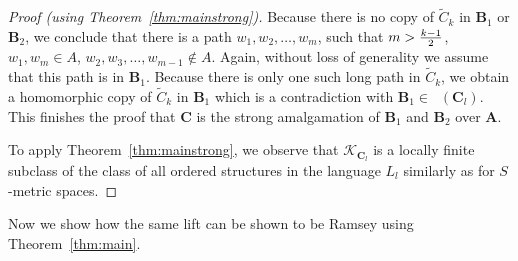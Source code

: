 \documentclass{elsarticle}
\def\Forb{\mathop{\mathrm{Forb_{he}}}\nolimits}
\def\str#1{\mathbf {#1}}
\def\K{{\mathcal K}}
\theoremstyle{plain}
\theoremstyle{definition}
\theoremstyle{remark}
\begin{document}
\begin{proof}[Proof (using Theorem~\ref{thm:mainstrong})]
Because there
is no copy of $\widetilde{C}_k$ in $\str{B}_1$ or $\str{B}_2$,
we conclude that there is a path  $w_1,w_2,\ldots, w_m$, such that $m>{k-1\over 2}$,
$w_1,w_m\in A$, $w_2,w_3,\ldots, w_{m-1}\notin A$.
Again, without loss of generality we assume that this path is in $\str{B}_1$. Because there
is only one such long path in $\widetilde{C}_k$, we obtain a homomorphic copy of $\widetilde{C}_k$
in $\str{B}_1$ which is a contradiction with $\str{B}_1\in \Forb(\str{C}_l)$.
This finishes the proof that  $\str{C}$ is the strong amalgamation of
$\str{B}_1$ and $\str{B}_2$ over $\str{A}$.

To apply Theorem~\ref{thm:mainstrong}, we observe that $\K_{\str{C}_l}$ is a locally finite
subclass of the class of all ordered structures in the language $L_l$ similarly as for $S$-metric spaces.
\end{proof}
Now we show how the same lift can be shown to be Ramsey using Theorem~\ref{thm:main}.
\end{document}
